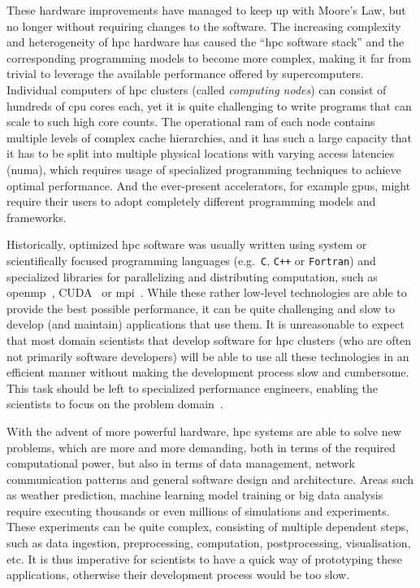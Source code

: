 These hardware improvements have managed to keep up with Moore's Law, but no longer without
requiring changes to the software. The increasing complexity and heterogeneity of
\gls{hpc} hardware has caused the ``\gls{hpc} software stack'' and the
corresponding programming models to become more complex, making it far from trivial to leverage the
available performance offered by supercomputers. Individual computers of \gls{hpc}
clusters (called \emph{computing nodes}) can consist of hundreds of \gls{cpu} cores
each, yet it is quite challenging to write programs that can scale to such high core counts. The
operational \gls{ram} of each node contains multiple levels of complex cache
hierarchies, and it has such a large capacity that it has to be split into multiple physical
locations with varying access latencies (\gls{numa}), which requires usage of
specialized programming techniques to achieve optimal performance. And the ever-present
accelerators, for example \glspl{gpu}, might require their users to adopt completely
different programming models and frameworks.

Historically, optimized \gls{hpc} software was usually written using system or
scientifically focused programming languages (e.g.~\texttt{C}, \texttt{C++}
or \texttt{Fortran}) and specialized libraries for parallelizing and distributing
computation, such as \gls{openmp}~\cite{openmp}, CUDA~\cite{cuda} or
\gls{mpi}~\cite{mpistudy}. While these rather low-level technologies are able
to provide the best possible performance, it can be quite challenging and slow to develop (and
maintain) applications that use them. It is unreasonable to expect that most domain scientists that
develop software for \gls{hpc} clusters (who are often not primarily software
developers) will be able to use all these technologies in an efficient manner without making the
development process slow and cumbersome. This task should be left to specialized performance
engineers, enabling the scientists to focus on the problem domain~\cite{dace}.

With the advent of more powerful hardware, \gls{hpc} systems are able to solve new
problems, which are more and more demanding, both in terms of the required computational power, but
also in terms of data management, network communication patterns and general software design and
architecture. Areas such as weather prediction, machine learning model training or big data
analysis require executing thousands or even millions of simulations and experiments. These
experiments can be quite complex, consisting of multiple dependent steps, such as data ingestion,
preprocessing, computation, postprocessing, visualisation, etc. It is thus imperative for
scientists to have a quick way of prototyping these applications, otherwise their development
process would be too slow.


